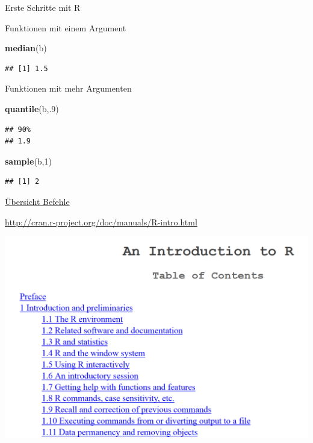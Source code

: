 \documentclass[ignorenonframetext,]{beamer}
\newenvironment{Shaded}{}{}
\newcommand{\KeywordTok}[1]{\textcolor[rgb]{0.00,0.44,0.13}{\textbf{{#1}}}}
\newcommand{\DecValTok}[1]{\textcolor[rgb]{0.25,0.63,0.44}{{#1}}}
\newcommand{\NormalTok}[1]{{#1}}
\begin{document}
\begin{frame}[fragile]{Erste Schritte mit R}
\begin{block}{Funktionen mit einem Argument}
\begin{Shaded}
\begin{Highlighting}[]
\KeywordTok{median}\NormalTok{(b)}
\end{Highlighting}
\end{Shaded}

\begin{verbatim}
## [1] 1.5
\end{verbatim}

\end{block}

\begin{block}{Funktionen mit mehr Argumenten}

\begin{Shaded}
\begin{Highlighting}[]
\KeywordTok{quantile}\NormalTok{(b,.}\DecValTok{9}\NormalTok{)}
\end{Highlighting}
\end{Shaded}

\begin{verbatim}
## 90% 
## 1.9
\end{verbatim}

\begin{Shaded}
\begin{Highlighting}[]
\KeywordTok{sample}\NormalTok{(b,}\DecValTok{1}\NormalTok{) }
\end{Highlighting}
\end{Shaded}

\begin{verbatim}
## [1] 2
\end{verbatim}

\end{block}

\begin{block}{\href{http://cran.r-project.org/doc/manuals/R-intro.html}{Übersicht
Befehle}}

\url{http://cran.r-project.org/doc/manuals/R-intro.html}

\includegraphics{./tex2pdf.9796/5d240a600e94270437008ff177d88aceaa547418.png}


\end{block}
\end{frame}
\end{document}
